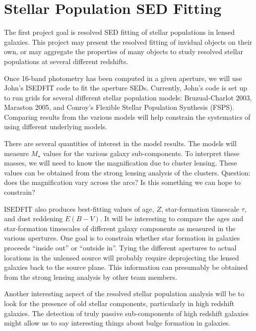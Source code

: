 \documentclass{emulateapj}
\begin{document}

\section{Stellar Population SED Fitting}\label{SED_fit}

The first project goal is resolved SED fitting of stellar populations
in lensed galaxies.  This project may present the resolved fitting of
invidual objects on their own, or may aggregate the properties of many
objects to study resolved stellar populations at several different
redshifts.  

Once 16-band photometry has been computed in a given aperture, we will
use John's ISEDFIT code to fit the aperture SEDs.  Currently, John's
code is set up to run grids for several different stellar population
models: Bruzual-Charlot 2003, Maraston 2005, and Conroy's Flexible
Stellar Population Synthesis (FSPS).  Comparing results from the
various models will help constrain the systematics of using different
underlying models.  

There are several quantities of interest in the model results.  The
models will measure $M_{\star}$ values for the various galaxy
sub-components.  To interpret these masses, we will need to know the
magnification due to cluster lensing.  These values can be obtained
from the strong lensing analysis of the clusters.  Question: does the
magnification vary across the arcs?  Is this something we can hope to
constrain?  

ISEDFIT also produces best-fitting values of age, $Z$, star-formation
timescale $\tau$, and dust reddening $E(B-V)$.  It will be interesting
to compare the ages and star-formation timescales of different galaxy
components as measured in the various apertures.  One goal is to
constrain whether star formation in galaxies proceeds ``inside out''
or ``outside in''.  Tying the different apertures to actual locations
in the unlensed source will probably require deprojecting the lensed
galaxies back to the source plane.  This information can presumably be
obtained from the strong lensing analysis by other team members.

Another interesting aspect of the resolved stellar population analysis
will be to look for the presence of old stellar components,
particularly in high redshift galaxies.  The detection of truly
passive sub-components of high redshift galaxies might allow us to say
interesting things about bulge formation in galaxies.  
\end{document}
